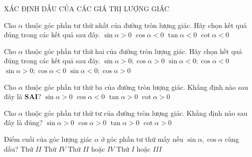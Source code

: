 
\begin{dang}
   { XÁC ĐỊNH DẤU CỦA CÁC GIÁ TRỊ LƯỢNG GIÁC}
\end{dang}
\begin{ex}%
Cho $\alpha $ thuộc góc phần tư thứ nhất của đường tròn lượng giác. Hãy chọn kết quả đúng trong các kết quả sau đây.
\choice
{\True $\sin \alpha >0$}
{$\cos \alpha <0$}
{$\tan \alpha <0$}
{$\cot \alpha <0$}
\end{ex}
\begin{ex}%
Cho $\alpha $ thuộc góc phần tư thứ hai của đường tròn lượng giác. Hãy chọn kết quả đúng trong các kết quả sau đây.
\choice
{$\sin \alpha >0; \cos\alpha >0$}
{$\sin \alpha <0; \cos\alpha <0$}
{\True $\sin \alpha >0; \cos\alpha <0$}
{$\sin \alpha <0; \cos\alpha >0$}
\end{ex}
\begin{ex}%
Cho $\alpha $ thuộc góc phần tư thứ ba của đường tròn lượng giác. Khẳng định nào sau đây là {\bf SAI}?
\choice
{\True $\sin \alpha >0$}
{$\cos \alpha <0$}
{$\tan \alpha >0$}
{$\cot \alpha >0$}
\end{ex}

\begin{ex}%
Cho $\alpha $ thuộc góc phần tư thứ tư của đường tròn lượng giác. Khẳng định nào sau đây là đúng?
\choice
{$\sin \alpha >0$}
{\True $\cos \alpha >0$}
{$\tan \alpha >0$}
{$\cot \alpha >0$}
\end{ex}

\begin{ex}%
Điểm cuối của góc lượng giác $\alpha $ ở góc phần tư thứ mấy nếu $\sin \alpha, \cos \alpha $ cùng dấu? 
\choice
{Thứ $II$}
{Thứ $ IV$}
{Thứ $ II$ hoặc $ IV$}
{\True Thứ $ I$ hoặc $ III$}
\loigiai{
} 
\end{ex}

